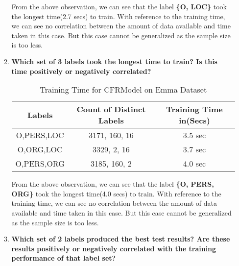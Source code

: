 \documentclass[12pt]{article}
\begin{document}
\begin{enumerate}
\begin{enumerate}[label={\alph*.}]
From the above observation, we can see that the label \textbf{\{O, LOC\}} took the longest time(2.7 secs) to train. With reference to the training time, we can see no correlation between the amount of data available and time taken in this case. But this case cannot be generalized as the sample size is too less.\\



\item  \textbf{Which set of 3 labels took the longest time to train? Is this time positively or negatively correlated?}
\begin{center}
\begin{table}[ht!]
\centering
\begin{tabular}{ |c|c|c|} 
\hline 
\textbf{Labels} & \textbf{Count of Distinct Labels} & \textbf{Training Time in(Secs)} \\ [2ex]
\hline 
O,PERS,LOC & 3171, 160, 16 & 3.5 sec\\ [1ex]
\hline 
O,ORG,LOC & 3329, 2, 16 & 3.7 sec\\ [1ex]
\hline
O,PERS,ORG & 3185, 160, 2 & 4.0 sec\\ [1ex]
\hline
\end{tabular}
\caption{Training Time for CFRModel on Emma Dataset}
\label{table:8}
\end{table}
\end{center}
From the above observation, we can see that the label \textbf{\{O, PERS, ORG\}} took the longest time(4.0 secs) to train. With reference to the training time, we can see no correlation between the amount of data available and time taken in this case. But this case cannot be generalized as the sample size is too less.\\

\item \textbf{Which set of 2 labels produced the best test results? Are these results positively or negatively correlated with the training performance of that label set?}


\end{enumerate}
\end{enumerate}
\end{document}
